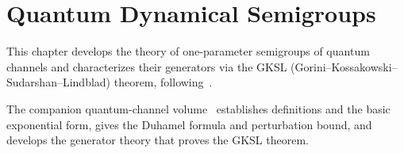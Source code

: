 
\chapter{Quantum Dynamical Semigroups}
\label{ch:semigroup}

This chapter develops the theory of one-parameter semigroups of quantum
channels and characterizes their generators via the
GKSL (Gorini--Kossakowski--Sudarshan--Lindblad) theorem,
following~\cite[Chapter~7]{Wolf2012Quantum}.

The companion quantum-channel volume~\cite[``Every continuous semigroup is exponential'']{QICLean2026Blueprint} establishes definitions and the basic
exponential form, gives the Duhamel formula and perturbation bound, and
develops the generator theory that proves the GKSL theorem.

